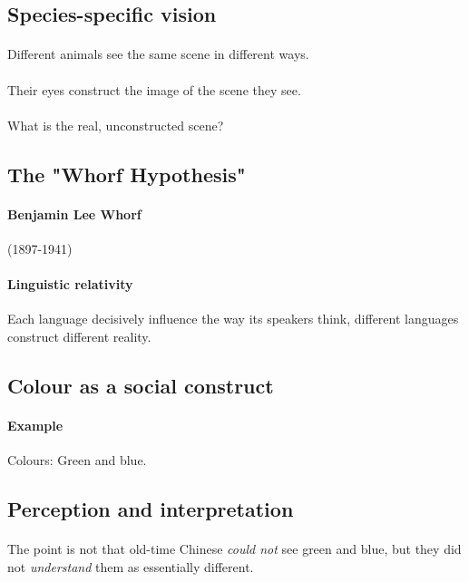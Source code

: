 \documentclass{article}
\begin{document}
	\subsection{Species-specific vision}
	\paragraph{} Different animals see the same scene in different ways.
	\paragraph{} Their eyes construct the image of the scene they see.
	\paragraph{} What is the real, unconstructed scene?
	
	\subsection{The "Whorf Hypothesis"}
	\paragraph{Benjamin Lee Whorf} (1897-1941)
	\paragraph{Linguistic relativity} Each language decisively influence the way its speakers think, different languages construct different reality.
	
	\subsection{Colour as a social construct}
	\paragraph{Example} Colours: Green and blue.
	
	\subsection{Perception and interpretation}
	\paragraph{} The point is not that old-time Chinese \emph{could not} see green and blue, but they did not \emph{understand} them as essentially different.
\end{document}
